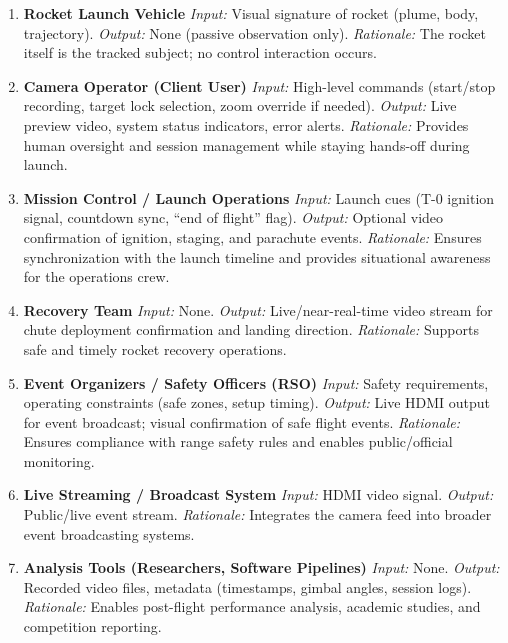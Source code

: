 \documentclass[12pt]{article}
\begin{document}
\begin{enumerate}[wide=0pt, leftmargin=*]
  \item \textbf{Rocket Launch Vehicle}
        \emph{Input:} Visual signature of rocket (plume, body, trajectory).
        \emph{Output:} None (passive observation only).
        \emph{Rationale:} The rocket itself is the tracked subject; no control
        interaction occurs.

  \item \textbf{Camera Operator (Client User)}
        \emph{Input:} High-level commands (start/stop recording, target lock
        selection, zoom override if needed).
        \emph{Output:} Live preview video, system status indicators, error
        alerts.
        \emph{Rationale:} Provides human oversight and session management while
        staying hands-off during launch.

  \item \textbf{Mission Control / Launch Operations}
        \emph{Input:} Launch cues (T-0 ignition signal, countdown sync, “end of
        flight” flag).
        \emph{Output:} Optional video confirmation of ignition, staging, and
        parachute events.
        \emph{Rationale:} Ensures synchronization with the launch timeline and
        provides situational awareness for the operations crew.

  \item \textbf{Recovery Team}
        \emph{Input:} None.
        \emph{Output:} Live/near-real-time video stream for chute deployment
        confirmation and landing direction.
        \emph{Rationale:} Supports safe and timely rocket recovery operations.

  \item \textbf{Event Organizers / Safety Officers (RSO)}
        \emph{Input:} Safety requirements, operating constraints (safe zones,
        setup timing).
        \emph{Output:} Live HDMI output for event broadcast; visual confirmation
        of safe flight events.
        \emph{Rationale:} Ensures compliance with range safety rules and enables
        public/official monitoring.

  \item \textbf{Live Streaming / Broadcast System}
        \emph{Input:} HDMI video signal.
        \emph{Output:} Public/live event stream.
        \emph{Rationale:} Integrates the camera feed into broader event
        broadcasting systems.

  \item \textbf{Analysis Tools (Researchers, Software Pipelines)}
        \emph{Input:} None.
        \emph{Output:} Recorded video files, metadata (timestamps, gimbal angles,
        session logs).
        \emph{Rationale:} Enables post-flight performance analysis, academic
        studies, and competition reporting.


\end{enumerate}
\end{document}
